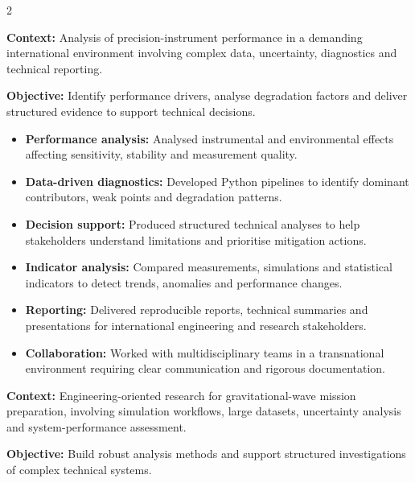 \documentclass[8pt,a4paper,ragged2e,withhyper]{altacv}
\begin{document}
\begin{paracol}{2}
\divider


\textbf{Context:} Analysis of precision-instrument performance in a demanding international environment involving complex data, uncertainty, diagnostics and technical reporting.

\textbf{Objective:} Identify performance drivers, analyse degradation factors and deliver structured evidence to support technical decisions.

\begin{itemize}
  \item \textbf{Performance analysis:} Analysed instrumental and environmental effects affecting sensitivity, stability and measurement quality.
  \item \textbf{Data-driven diagnostics:} Developed Python pipelines to identify dominant contributors, weak points and degradation patterns.
  \item \textbf{Decision support:} Produced structured technical analyses to help stakeholders understand limitations and prioritise mitigation actions.
  \item \textbf{Indicator analysis:} Compared measurements, simulations and statistical indicators to detect trends, anomalies and performance changes.
  \item \textbf{Reporting:} Delivered reproducible reports, technical summaries and presentations for international engineering and research stakeholders.
  \item \textbf{Collaboration:} Worked with multidisciplinary teams in a transnational environment requiring clear communication and rigorous documentation.
\end{itemize}

\divider


\textbf{Context:} Engineering-oriented research for gravitational-wave mission preparation, involving simulation workflows, large datasets, uncertainty analysis and system-performance assessment.

\textbf{Objective:} Build robust analysis methods and support structured investigations of complex technical systems.


\end{paracol}
\end{document}

